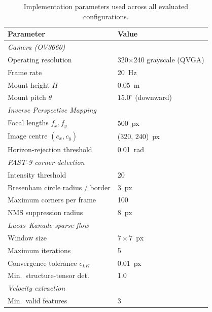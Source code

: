 \documentclass[conference]{IEEEtran}
\begin{document}
\begin{table}[!t]
\centering
\caption{Implementation parameters used across all evaluated configurations.}
\label{tab:params}
\renewcommand{\arraystretch}{1.1}
\footnotesize
\begin{tabular}{l l}
\toprule
\textbf{Parameter} & \textbf{Value} \\
\midrule
\multicolumn{2}{l}{\textit{Camera (OV3660)}} \\
\quad Operating resolution                       & 320$\times$240 grayscale (QVGA) \\
\quad Frame rate                                 & 20~Hz \\
\quad Mount height $H$                           & 0.05~m \\
\quad Mount pitch $\theta$                       & $15.0^{\circ}$ (downward) \\
\midrule
\multicolumn{2}{l}{\textit{Inverse Perspective Mapping}} \\
\quad Focal lengths $f_x, f_y$                   & 500~px \\
\quad Image centre $(c_x, c_y)$                  & (320, 240)~px \\
\quad Horizon-rejection threshold                & 0.01~rad \\
\midrule
\multicolumn{2}{l}{\textit{FAST-9 corner detection}} \\
\quad Intensity threshold                        & 20 \\
\quad Bresenham circle radius / border           & 3~px \\
\quad Maximum corners per frame                  & 100 \\
\quad NMS suppression radius                     & 8~px \\
\midrule
\multicolumn{2}{l}{\textit{Lucas--Kanade sparse flow}} \\
\quad Window size                                & $7\times 7$~px \\
\quad Maximum iterations                         & 5 \\
\quad Convergence tolerance $\epsilon_{\!LK}$    & 0.01~px \\
\quad Min.\ structure-tensor det.\               & 1.0 \\
\midrule
\multicolumn{2}{l}{\textit{Velocity extraction}} \\
\quad Min.\ valid features                       & 3 \\

\end{tabular}
\end{table}
\end{document}
